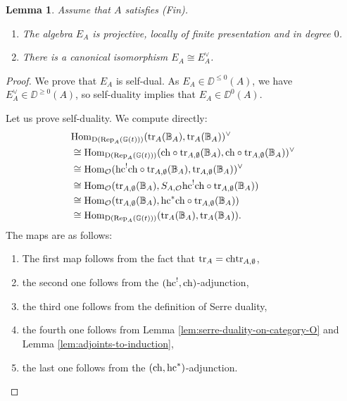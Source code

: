 \documentclass[a4paper, 10pt, oneside, reqno]{amsart}
\theoremstyle{plain}
\newtheorem{lem}[thm]{Lemma}
\theoremstyle{definition}
\theoremstyle{remark}
\newcommand{\Gbb}{\mathbb{G}}
\begin{document}
\begin{lem}\label{lem:self-duality}
Assume that $A$ satisfies (Fin).
\begin{enumerate}
\item The algebra $E_A$ is projective, locally of finite presentation and in degree $0$.
\item There is a canonical isomorphism $E_A \cong E_A^{\vee}$.
\end{enumerate}
\end{lem}

\begin{proof}
We prove that $E_A$ is self-dual. As $E_A \in \DD^{\leq 0}(A)$, we have $E_A^{\vee} \in \DD^{\geq 0}(A)$, so self-duality implies that $E_A \in \DD^0(A)$. 

Let us prove self-duality. We compute directly:
\begin{align*}
&\Hom_{\DD(\Rep_A(\Gbb(t)))}(\tr_A(\mathbb{B}_A), \tr_A(\mathbb{B}_A))^{\vee}\\
&\cong \Hom_{\DD(\Rep_A(\Gbb(t)))}(\ch \circ \tr_{A,\emptyset}(\mathbb{B}_A), \ch \circ\tr_{A,\emptyset}(\mathbb{B}_A))^{\vee} \\
&\cong \Hom_{\Ocal}(\hc^!\ch\circ \tr_{A,\emptyset}(\mathbb{B}_A), \tr_{A,\emptyset}(\mathbb{B}_A))^{\vee} \\
&\cong \Hom_{\Ocal}(\tr_{A,\emptyset}(\mathbb{B}_A), S_{A,\Ocal}\hc^!\ch \circ \tr_{A,\emptyset}(\mathbb{B}_A)) \\
&\cong \Hom_{\Ocal}(\tr_{A,\emptyset}(\mathbb{B}_A), \hc^*\ch\circ \tr_{A,\emptyset}(\mathbb{B}_A)) \\
&\cong \Hom_{\DD(\Rep_A(\Gbb(t)))}(\tr_A(\mathbb{B}_A), \tr_A(\mathbb{B}_A)).
\end{align*}
The maps are as follows: 
\begin{enumerate}
\item The first map follows from the fact that $\mathrm{tr}_A = \mathrm{ch} \mathrm{tr}_{A,\emptyset}$, 
\item the second one follows from the $(\mathrm{hc}^!, \mathrm{ch})$-adjunction,
\item the third one follows from the definition of Serre duality, 
\item the fourth one follows from Lemma \ref{lem:serre-duality-on-category-O} and Lemma \ref{lem:adjoints-to-induction}, 
\item the last one follows from the $(\mathrm{ch}, \mathrm{hc}^*)$-adjunction.
\end{enumerate}


\end{proof}
\end{document}
